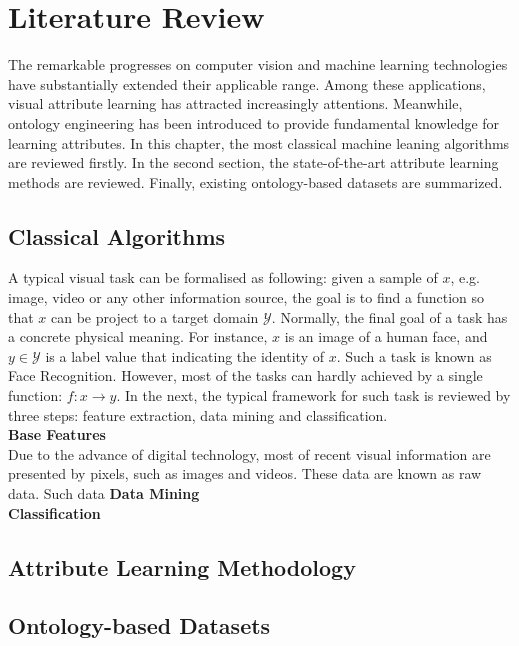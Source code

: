 
\chapter{Literature Review}
The remarkable progresses on computer vision and machine learning technologies have substantially extended their applicable range. Among these applications, visual attribute learning has attracted increasingly attentions. Meanwhile, ontology engineering has been introduced to provide fundamental knowledge for learning attributes. In this chapter, the most classical machine leaning algorithms are reviewed firstly. In the second section, the state-of-the-art attribute learning methods are reviewed. Finally, existing ontology-based datasets are summarized.

 
\section{Classical Algorithms}

A typical visual task can be formalised as following: given a sample of $x$, e.g. image, video or any other information source, the goal is to find a function so that $x$ can be project to a target domain $\mathcal{Y}$. Normally, the final goal of a task has a concrete physical meaning. For instance, $x$ is an image of a human face, and $y\in\mathcal{Y}$ is a label value that indicating the identity of $x$. Such a task is known as Face Recognition. However, most of the tasks can hardly achieved by a single function: $f:x\rightarrow y$. In the next, the typical framework for such task is reviewed by three steps: feature extraction, data mining and classification.\\ 

\textbf{Base Features} \\
Due to the advance of digital technology, most of recent visual information are presented by pixels, such as images and videos. These data are known as raw data. Such data 
\textbf{Data Mining}\\

\textbf{Classification}\\

\section{Attribute Learning Methodology}

\section{Ontology-based Datasets}






